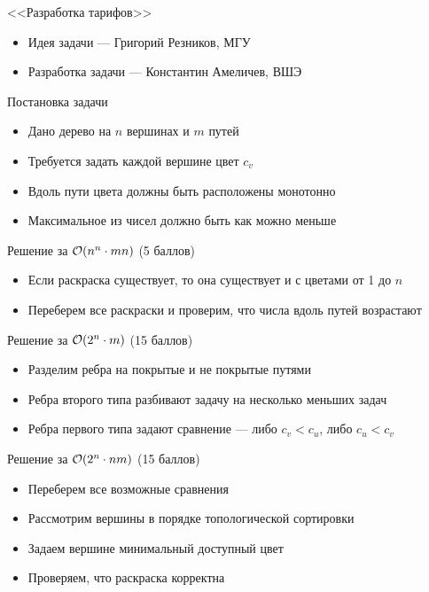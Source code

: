 \begin{frame}
  \begin{center}
    \LARGE <<Разработка тарифов>>
  \end{center}

  \begin{itemize}
  \item Идея задачи --- Григорий Резников, МГУ
  \item Разработка задачи --- Константин Амеличев, ВШЭ
  \end{itemize}

\end{frame}

\begin{frame}{Постановка задачи}

  \begin{itemize}
  \item Дано дерево на $n$ вершинах и $m$ путей
  \item Требуется задать каждой вершине цвет $c_v$
  \item Вдоль пути цвета должны быть расположены монотонно
  \item Максимальное из чисел должно быть как можно меньше
  \end{itemize}
  
\end{frame}

\begin{frame}{Решение за $\mathcal{O}(n^n \cdot mn)$ (5 баллов)}
  \begin{itemize}
  \item Если раскраска существует, то она существует и с цветами от 1 до $n$
  \item Переберем все раскраски и проверим, что числа вдоль путей возрастают
  \end{itemize}
\end{frame}
\begin{frame}{Решение за $\mathcal{O}(2^n \cdot m)$ (15 баллов)}
  \begin{itemize}
  \item Разделим ребра на покрытые и не покрытые путями
  \item Ребра второго типа разбивают задачу на несколько меньших задач
  \item Ребра первого типа задают сравнение --- либо $c_v < c_u$, либо $c_u < c_v$
  \end{itemize}
\end{frame}
\begin{frame}{Решение за $\mathcal{O}(2^n \cdot nm)$ (15 баллов)}
  \begin{itemize}
  \item Переберем все возможные сравнения
  \item Рассмотрим вершины в порядке топологической сортировки
  \item Задаем вершине минимальный доступный цвет
  \item Проверяем, что раскраска корректна
  \end{itemize}
\end{frame}

